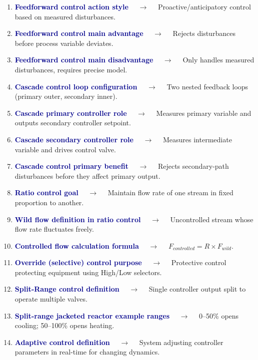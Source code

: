 \documentclass[11pt,a4paper]{article}
\begin{document}
\begin{enumerate}[label=\arabic*., leftmargin=*, labelsep=0.8em, itemsep=0.35em, parsep=0.1em, topsep=0.2em]
  \item \textcolor{darkblue}{\textbf{Feedforward control action style}} $\quad\to\quad$ Proactive/anticipatory control based on measured disturbances.
  \item \textcolor{darkblue}{\textbf{Feedforward control main advantage}} $\quad\to\quad$ Rejects disturbances before process variable deviates.
  \item \textcolor{darkblue}{\textbf{Feedforward control main disadvantage}} $\quad\to\quad$ Only handles measured disturbances, requires precise model.
  \item \textcolor{darkblue}{\textbf{Cascade control loop configuration}} $\quad\to\quad$ Two nested feedback loops (primary outer, secondary inner).
  \item \textcolor{darkblue}{\textbf{Cascade primary controller role}} $\quad\to\quad$ Measures primary variable and outputs secondary controller setpoint.
  \item \textcolor{darkblue}{\textbf{Cascade secondary controller role}} $\quad\to\quad$ Measures intermediate variable and drives control valve.
  \item \textcolor{darkblue}{\textbf{Cascade control primary benefit}} $\quad\to\quad$ Rejects secondary-path disturbances before they affect primary output.
  \item \textcolor{darkblue}{\textbf{Ratio control goal}} $\quad\to\quad$ Maintain flow rate of one stream in fixed proportion to another.
  \item \textcolor{darkblue}{\textbf{Wild flow definition in ratio control}} $\quad\to\quad$ Uncontrolled stream whose flow rate fluctuates freely.
  \item \textcolor{darkblue}{\textbf{Controlled flow calculation formula}} $\quad\to\quad$ $F_{controlled} = R \times F_{wild}$.
  \item \textcolor{darkblue}{\textbf{Override (selective) control purpose}} $\quad\to\quad$ Protective control protecting equipment using High/Low selectors.
  \item \textcolor{darkblue}{\textbf{Split-Range control definition}} $\quad\to\quad$ Single controller output split to operate multiple valves.
  \item \textcolor{darkblue}{\textbf{Split-range jacketed reactor example ranges}} $\quad\to\quad$ 0–50\% opens cooling; 50–100\% opens heating.
  \item \textcolor{darkblue}{\textbf{Adaptive control definition}} $\quad\to\quad$ System adjusting controller parameters in real-time for changing dynamics.

\end{enumerate}
\end{document}
